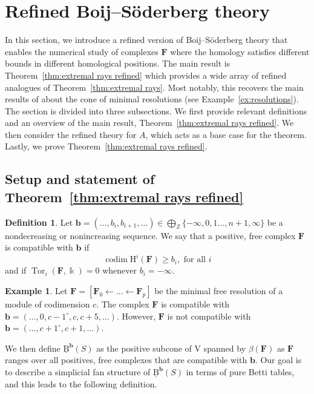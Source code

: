 \documentclass[12pt]{amsart}
\theoremstyle{definition}
\newtheorem{example}[lemma]{Example}
\newtheorem{defn}[lemma]{Definition}
\theoremstyle{remark}
\newcommand{\Tor}{\operatorname{Tor}}
\newcommand{\kk}{\Bbbk}
\newcommand{\codim}{\operatorname{codim}}
\newcommand{\HH}{\mathrm{H}}
\newcommand{\ZZ}{\mathbb{Z}}
\newcommand{\VV}{\mathrm{V}}
\newcommand{\bb}{\mathbf{b}}
\newcommand{\FF}{\mathbf{F}}
\newcommand{\defi}[1]{\textsf{#1}} %
\newcommand{\BBQ}{\underline{\mathrm{B}}}
\begin{document}
\section{Refined Boij--S\"oderberg theory}\label{sec:refined}
In this section, we introduce a refined version of Boij--S\"oderberg theory that enables the numerical study of complexes $\FF$ where the homology satisfies different bounds in different homological positions.  The main result is Theorem~\ref{thm:extremal rays refined} which provides a wide array of refined analogues of Theorem~\ref{thm:extremal rays}.  Most notably, this recovers the main results of \cite{boij-sod2} about the cone of minimal resolutions (see Example~\ref{ex:resolutions}).  The section is divided into three subsections.  We first provide relevant definitions and an overview of the main result, Theorem~\ref{thm:extremal rays refined}.  We then consider the refined theory for $A$, which acts as a base case for the theorem.  Lastly, we prove Theorem~\ref{thm:extremal rays refined}.

\subsection{Setup and statement of Theorem~\ref{thm:extremal rays refined}}


\begin{defn}
Let $\bb=(\dots, b_i, b_{i+1}, \dots ) \in \bigoplus_{\ZZ} \{-\infty, 0,1 \dots, n+1,\infty\}$ be a nondecreasing or nonincreasing sequence.   We say that a positive, free complex $\FF$ is \defi{compatible with $\bb$} if 
\[
\codim \HH^i(\FF) \geq b_i, \text{ for all } i
\]
and if $\Tor_i(\FF,\kk)=0$ whenever $b_i=-\infty$.
\end{defn}

\begin{example}
Let $\FF=[\FF_0\gets \dots \gets \FF_p]$ be the minimal free resolution of a module of codimension $c$.  The complex $\FF$ is compatible with $\bb=(\dots, 0,c-1^\circ,c,c+5,\dots)$.  However, $\FF$ is not compatible with $\bb=(\dots,c+1^\circ,c+1,\dots)$.  
\end{example}
We then define $\BBQ^{\bb}(S)$ as the positive subcone of $\VV$ spanned by $\beta(\FF)$ as $\FF$ ranges over all positives, free complexes that are compatible with $\bb$.  Our goal is to describe a simplicial fan structure of $\BBQ^{\bb}(S)$ in terms of pure Betti tables, and this leads to the following definition.
\end{document}
